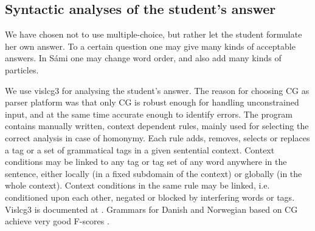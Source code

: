 \documentclass[11pt]{article}
\begin{document}


\subsection{Syntactic analyses of the student's answer} \label{sentencefeedback}
We have chosen not to use multiple-choice, but rather let the student formulate her own answer. To a certain question one may give many kinds of acceptable answers. In Sámi one may change word order, and also add many kinds of particles. 


We use vislcg3 for analysing the student's answer. The reason for choosing CG as parser platform was that only CG is robust enough for handling unconstrained input, and at the same time accurate enough to identify errors. The program contains manually written, context dependent rules, mainly used for selecting the correct analysis in case of homonymy. Each rule adds, removes, selects or replaces a tag or a set of grammatical tags in a given sentential context. Context conditions may be linked to any tag or tag set of any word anywhere in the sentence, either locally (in a fixed subdomain of the context) or globally (in the whole context). Context conditions in the same rule may be linked, i.e. conditioned upon each other, negated or blocked by interfering words or tags. Vislcg3 is documented at \cite{Visl:08}. Grammars for Danish and Norwegian based on CG achieve very good F-scores \cite{Bick:03}.
\end{document}
